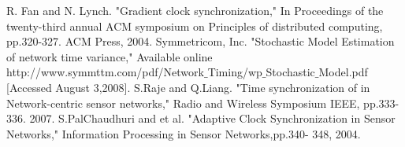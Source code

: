 \documentclass[a4paper,10pt]{report}
\begin{document}
\begin{thebibliography}{\textbf{References}}
R. Fan and N. Lynch. "Gradient clock synchronization," In Proceedings of the twenty-third annual ACM symposium on Principles of distributed computing, pp.320-327. ACM Press, 2004.
Symmetricom, Inc. "Stochastic Model Estimation of network time variance," Available online http://www.symmttm.com/pdf/Network$\_$Timing/wp$\_$Stochastic$\_$Model.pdf [Accessed August 3,2008].
S.Raje and Q.Liang. "Time synchronization of in Network-centric sensor networks," Radio and Wireless Symposium IEEE, pp.333-336. 2007.
S.PalChaudhuri and et al. "Adaptive Clock Synchronization in Sensor Networks," Information Processing in Sensor Networks,pp.340- 348, 2004.
\end{thebibliography}
\end{document}
